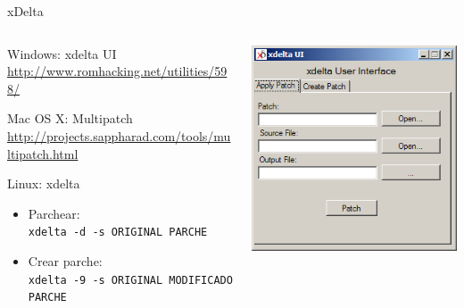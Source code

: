 \begin{frame}{xDelta}
    \begin{columns}
    \begin{column}{0.7\textwidth}
        \footnotesize
        \begin{wideitemize}
            \item<1-> Windows: xdelta UI \\ \url{http://www.romhacking.net/utilities/598/}

            \item<2-> Mac OS X: Multipatch \\ \url{http://projects.sappharad.com/tools/multipatch.html}

            \item<3-> Linux: xdelta
            \begin{itemize}
                \footnotesize
                \item Parchear: \\ \texttt{xdelta -d -s ORIGINAL PARCHE}
                \item Crear parche: \\ \texttt{xdelta -9 -s ORIGINAL MODIFICADO PARCHE}
            \end{itemize}
        \end{wideitemize}
    \end{column}
    \begin{column}{0.3\textwidth}
        \includegraphics[width=\textwidth]{imgs/xdelta_windows.png}

\end{column}
\end{columns}
\end{frame}
